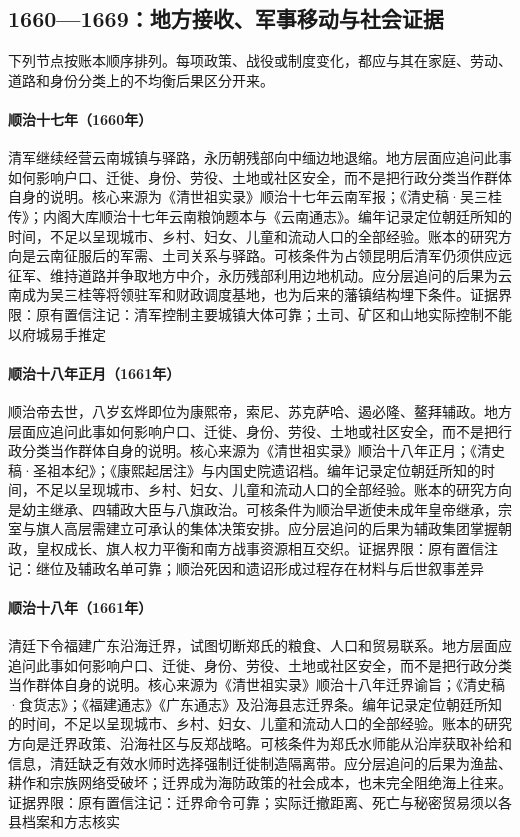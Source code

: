 \subsection{1660—1669：地方接收、军事移动与社会证据}
下列节点按账本顺序排列。每项政策、战役或制度变化，都应与其在家庭、劳动、道路和身份分类上的不均衡后果区分开来。
\hypertarget{social:EQ-1660-QING-YUNNAN-CONSOLIDATION}{}\paragraph{顺治十七年（1660年）}清军继续经营云南城镇与驿路，永历朝残部向中缅边地退缩。地方层面应追问此事如何影响户口、迁徙、身份、劳役、土地或社区安全，而不是把行政分类当作群体自身的说明。核心来源为《清世祖实录》顺治十七年云南军报；《清史稿·吴三桂传》；内阁大库顺治十七年云南粮饷题本与《云南通志》。编年记录定位朝廷所知的时间，不足以呈现城市、乡村、妇女、儿童和流动人口的全部经验。账本的研究方向是云南征服后的军需、土司关系与驿路。可核条件为占领昆明后清军仍须供应远征军、维持道路并争取地方中介，永历残部利用边地机动。应分层追问的后果为云南成为吴三桂等将领驻军和财政调度基地，也为后来的藩镇结构埋下条件。证据界限：原有置信注记：清军控制主要城镇大体可靠；土司、矿区和山地实际控制不能以府城易手推定
\hypertarget{social:EQ-1661-KANGXI-ACCESSION}{}\paragraph{顺治十八年正月（1661年）}顺治帝去世，八岁玄烨即位为康熙帝，索尼、苏克萨哈、遏必隆、鳌拜辅政。地方层面应追问此事如何影响户口、迁徙、身份、劳役、土地或社区安全，而不是把行政分类当作群体自身的说明。核心来源为《清世祖实录》顺治十八年正月；《清史稿·圣祖本纪》；《康熙起居注》与内国史院遗诏档。编年记录定位朝廷所知的时间，不足以呈现城市、乡村、妇女、儿童和流动人口的全部经验。账本的研究方向是幼主继承、四辅政大臣与八旗政治。可核条件为顺治早逝使未成年皇帝继承，宗室与旗人高层需建立可承认的集体决策安排。应分层追问的后果为辅政集团掌握朝政，皇权成长、旗人权力平衡和南方战事资源相互交织。证据界限：原有置信注记：继位及辅政名单可靠；顺治死因和遗诏形成过程存在材料与后世叙事差异
\hypertarget{social:EQ-1661-COAST-EVACUATION}{}\paragraph{顺治十八年（1661年）}清廷下令福建广东沿海迁界，试图切断郑氏的粮食、人口和贸易联系。地方层面应追问此事如何影响户口、迁徙、身份、劳役、土地或社区安全，而不是把行政分类当作群体自身的说明。核心来源为《清世祖实录》顺治十八年迁界谕旨；《清史稿·食货志》；《福建通志》《广东通志》及沿海县志迁界条。编年记录定位朝廷所知的时间，不足以呈现城市、乡村、妇女、儿童和流动人口的全部经验。账本的研究方向是迁界政策、沿海社区与反郑战略。可核条件为郑氏水师能从沿岸获取补给和信息，清廷缺乏有效水师时选择强制迁徙制造隔离带。应分层追问的后果为渔盐、耕作和宗族网络受破坏；迁界成为海防政策的社会成本，也未完全阻绝海上往来。证据界限：原有置信注记：迁界命令可靠；实际迁撤距离、死亡与秘密贸易须以各县档案和方志核实
